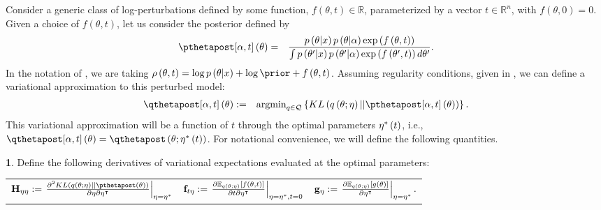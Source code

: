 \documentclass{article}\usepackage[]{graphicx}\usepackage[]{color}
\providecommand{\tabularnewline}{\\}
\theoremstyle{plain}
\theoremstyle{definition}
\newtheorem{defn}[thm]{\protect\definitionname}
\theoremstyle{plain}
\theoremstyle{plain}
\theoremstyle{plain}
\theoremstyle{plain}
\providecommand{\definitionname}{Definition}
\begin{document}
Consider a generic class of log-perturbations defined by some function,
$f\left(\theta,t\right)\in\mathbb{R}$, parameterized by a vector
$t\in\mathbb{R}^{n}$, with $f\left(\theta,0\right)=0$. Given a choice
of $f\left(\theta,t\right)$, let us consider the posterior defined
by
\begin{eqnarray}
\ptthetapost\left(\theta\right) & = & \frac{p\left(\theta\vert x\right)p\left(\theta\vert\alpha\right)\exp\left(f\left(\theta,t\right)\right)}{\int p\left(\theta'\vert x\right)p\left(\theta'\vert\alpha\right)\exp\left(f\left(\theta',t\right)\right)d\theta'}.\label{eq:p_tilting}
\end{eqnarray}
In the notation of , we are taking $\rho\left(\theta,t\right)=\log p\left(\theta\vert x\right)+\log\prior+f\left(\theta,t\right)$.
Assuming regularity conditions, given in , we
can define a variational approximation to this perturbed model:
\begin{eqnarray}
\qtthetapost\left(\theta\right) & := & \textrm{argmin}_{q\in\mathcal{Q}}\left\{ KL\left(q\left(\theta;\eta\right)||\ptthetapost\left(\theta\right)\right)\right\} .\label{eq:perturbed_vb_approximation}
\end{eqnarray}
This variational approximation will be a function of $t$ through
the optimal parameters $\eta^{*}\left(t\right)$, i.e., $\qtthetapost\left(\theta\right)=\qtthetapostarg$.
For notational convenience, we will define the following quantities.
\begin{defn}
\label{def:vb_derivatives}Define the following derivatives of variational
expectations evaluated at the optimal parameters:

\begin{tabular}{ccc}
$\klhess:=\left.\frac{\partial^{2}KL\left(q\left(\theta;\eta\right)||\pthetapost\left(\theta\right)\right)}{\partial\eta\partial\eta^{\trans}}\right|_{\eta=\etaopt}$ &
$\mathbf{f}_{t\eta}:=\left.\frac{\partial\mathbb{E}_{q\left(\theta;\eta\right)}\left[f\left(\theta,t\right)\right]}{\partial t\partial\eta^{\intercal}}\right|_{\eta=\eta^{*},t=0}$ &
$\mathbf{g}_{\eta}:=\left.\frac{\partial\mathbb{E}_{q\left(\theta;\eta\right)}\left[g\left(\theta\right)\right]}{\partial\eta^{\intercal}}\right|_{\eta=\eta^{*}}.$\tabularnewline
\end{tabular}
\end{defn}
\end{document}
